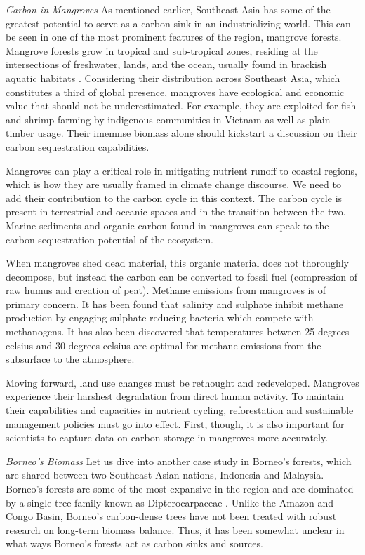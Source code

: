 \textit{Carbon in Mangroves} \newline
As mentioned earlier, Southeast Asia has some of the greatest potential to serve as a carbon sink in an industrializing world. This can be seen in one of the most prominent features of the region, mangrove forests. Mangrove forests grow in tropical and sub-tropical zones, residing at the intersections of freshwater, lands, and the ocean, usually found in brackish aquatic habitats \citep{bravo2017managing}. Considering their distribution across Southeast Asia, which constitutes a third of global presence,  mangroves have ecological and economic value that should not be underestimated. For example, they are exploited for fish and shrimp farming by indigenous communities in Vietnam as well as plain timber usage. Their imemnse biomass alone should kickstart a discussion on their carbon sequestration capabilities.

Mangroves can play a critical role in mitigating nutrient runoff to coastal regions, which is how they are usually framed in climate change discourse. We need to add their contribution to the carbon cycle in this context. The carbon cycle is present in terrestrial and oceanic spaces and in the transition between the two. Marine sediments and organic carbon found in mangroves can speak to the carbon sequestration potential of the ecosystem.

When mangroves shed dead material, this organic material does not thoroughly decompose, but instead the carbon can be converted to fossil fuel (compression of raw humus and creation of peat). Methane emissions from mangroves is of primary concern. It has been found that salinity and sulphate inhibit methane production by engaging sulphate-reducing bacteria which compete with methanogens. It has also been discovered that temperatures between 25 degrees celsius and 30 degrees celsius are optimal for methane emissions from the subsurface to the atmosphere. 

Moving forward, land use changes must be rethought and redeveloped. Mangroves experience their harshest degradation from direct human activity. To maintain their capabilities and capacities in nutrient cycling, reforestation and sustainable management policies must go into effect. First, though, it is also important for scientists to capture data on carbon storage in mangroves more accurately.

\textit{Borneo's Biomass} \newline
Let us dive into another case study in Borneo's forests, which are shared between two Southeast Asian nations, Indonesia and Malaysia. Borneo's forests are some of the most expansive in the region and are dominated by a single tree family known as Dipterocarpaceae \citep{qie2017long}. Unlike the Amazon and Congo Basin, Borneo's carbon-dense trees have not been treated with robust research on long-term biomass balance. Thus, it has been somewhat unclear in what ways Borneo's forests act as carbon sinks and sources.

